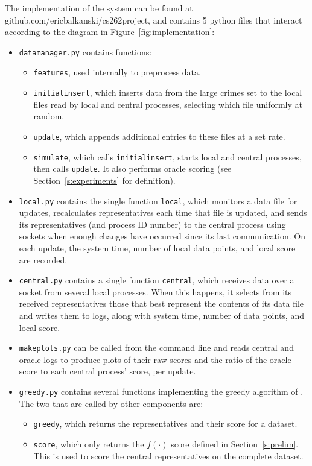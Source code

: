 The implementation of the system can be found at github.com/ericbalkanski/cs262project, and contains 5 python files that interact according to the diagram in Figure~\ref{fig:implementation}:
\begin{itemize}
    \item \texttt{datamanager.py} contains functions:
    \begin{itemize}
        \item \texttt{features}, used internally to preprocess data.
        \item \texttt{initialinsert}, which inserts data from the large crimes set to the local files read by local and central processes, selecting which file uniformly at random.
        \item \texttt{update}, which appends additional entries to these files at a set rate.
        \item \texttt{simulate}, which calls \texttt{initialinsert}, starts local and central processes, then calls \texttt{update}. It also performs oracle scoring (see Section~\ref{s:experiments} for definition).
    \end{itemize}
    \item \texttt{local.py} contains the single function \texttt{local}, which monitors a data file for updates, recalculates representatives each time that file is updated, and sends its representatives (and process ID number) to the central process using sockets when enough changes have occurred since its last communication. On each update, the system time, number of local data points, and local score are recorded.
    \item \texttt{central.py} contains a single function \texttt{central}, which receives data over a socket from several local processes. When this happens, it selects from its received representatives those that best represent the contents of its data file and writes them to logs, along with system time, number of data points, and local score.
    \item \texttt{makeplots.py} can be called from the command line and reads central and oracle logs to produce plots of their raw scores and the ratio of the oracle score to each central process' score, per update.
    \item \texttt{greedy.py} contains several functions implementing the greedy algorithm of \citet{mirzasoleiman2013distributed}. The two that are called by other components are:
    \begin{itemize}
        \item \texttt{greedy}, which returns the representatives and their score for a dataset.
        \item \texttt{score}, which only returns the $f(\cdot)$ score defined in Section~\ref{s:prelim}. This is used to score the central representatives on the complete dataset.
    \end{itemize}
\end{itemize}

